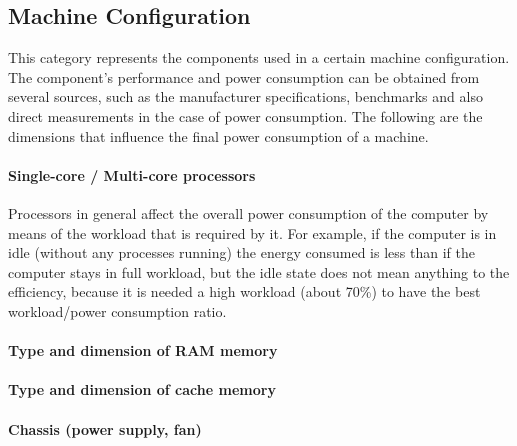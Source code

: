     \subsection{Machine Configuration}\label{sec2:machine_configuration}
        This category represents the components used in a certain machine configuration. The component's performance and power consumption can be obtained from several sources, such as the manufacturer specifications, benchmarks and also direct measurements in the case of power consumption.
        The following are the dimensions that influence the final power consumption of a machine.
            \paragraph*{Single-core / Multi-core processors} Processors in general affect the overall power consumption of the computer by means of the workload that is required by it. For example, if the computer is in idle (without any processes running) the energy consumed is less than if the computer stays in full workload, but the idle state does not mean anything to the efficiency, because it is needed a high workload (about 70\%) to have the best workload/power consumption ratio.
            \paragraph*{Type and dimension of RAM memory}%
            \paragraph*{Type and dimension of cache memory}%
            \paragraph*{Chassis (power supply, fan)} 
